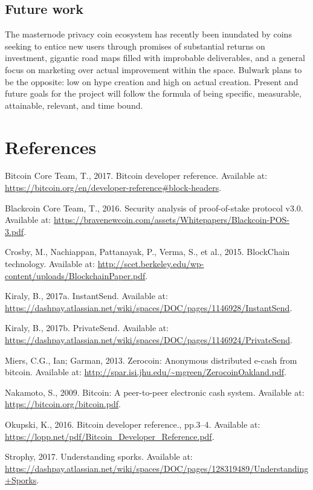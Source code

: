 \documentclass[11pt,a4paperpaper,]{report}
\begin{document}
\section{Future work}\label{future-work}

The masternode privacy coin ecosystem has recently been inundated by
coins seeking to entice new users through promises of substantial
returns on investment, gigantic road maps filled with improbable
deliverables, and a general focus on marketing over actual improvement
within the space. Bulwark plans to be the opposite: low on hype creation
and high on actual creation. Present and future goals for the project
will follow the formula of being specific, measurable, attainable,
relevant, and time bound.

\footnotesize

\chapter*{References}\label{references}

\hypertarget{refs}{}
\hypertarget{ref-Bitcoindev}{}
Bitcoin Core Team, T., 2017. Bitcoin developer reference. Available at:
\url{https://bitcoin.org/en/developer-reference\#block-headers}.

\hypertarget{ref-Blackcoin}{}
Blackcoin Core Team, T., 2016. Security analysis of proof-of-stake
protocol v3.0. Available at:
\url{https://bravenewcoin.com/assets/Whitepapers/Blackcoin-POS-3.pdf}.

\hypertarget{ref-Crosby}{}
Crosby, M., Nachiappan, Pattanayak, P., Verma, S., et al., 2015.
BlockChain technology. Available at:
\url{http://scet.berkeley.edu/wp-content/uploads/BlockchainPaper.pdf}.

\hypertarget{ref-InstantSend}{}
Kiraly, B., 2017a. InstantSend. Available at:
\url{https://dashpay.atlassian.net/wiki/spaces/DOC/pages/1146928/InstantSend}.

\hypertarget{ref-PrivateSend}{}
Kiraly, B., 2017b. PrivateSend. Available at:
\url{https://dashpay.atlassian.net/wiki/spaces/DOC/pages/1146924/PrivateSend}.

\hypertarget{ref-Zerocoin}{}
Miers, C.G., Ian; Garman, 2013. Zerocoin: Anonymous distributed e-cash
from bitcoin. Available at:
\url{http://spar.isi.jhu.edu/~mgreen/ZerocoinOakland.pdf}.

\hypertarget{ref-Bitcoin}{}
Nakamoto, S., 2009. Bitcoin: A peer-to-peer electronic cash system.
Available at: \url{https://bitcoin.org/bitcoin.pdf}.

\hypertarget{ref-Bitcoindevreference}{}
Okupski, K., 2016. Bitcoin developer reference., pp.3--4. Available at:
\url{https://lopp.net/pdf/Bitcoin_Developer_Reference.pdf}.

\hypertarget{ref-Sporks}{}
Strophy, 2017. Understanding sporks. Available at:
\url{https://dashpay.atlassian.net/wiki/spaces/DOC/pages/128319489/Understanding+Sporks}.
\end{document}
